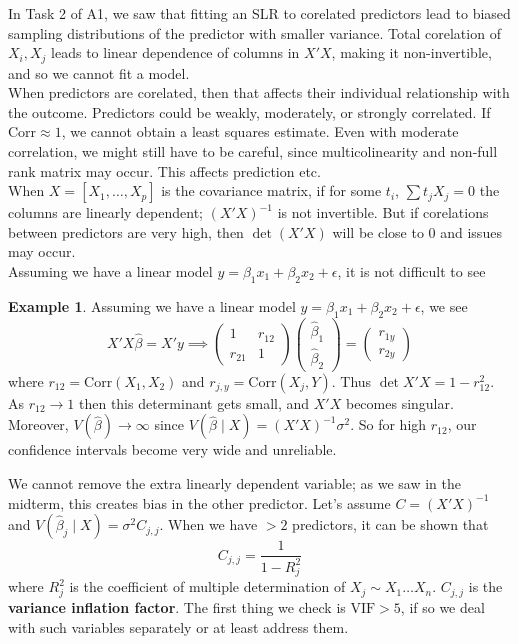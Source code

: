 \documentclass[12pt, a4paper]{article}
\theoremstyle{definition}
\newtheorem{example}{Example}
\newcommand{\imp}{\implies}
\newcommand{\eps}{\epsilon}
\newcommand{\f}{\frac}
\newcommand{\Corr}{\mathrm{Corr}}
\newcommand{\pmat}[1]{\begin{pmatrix}#1\end{pmatrix}}
\begin{document}
	In Task 2 of A1, we saw that fitting an SLR to corelated predictors lead to biased sampling distributions of the predictor with smaller variance. Total corelation of $X_i, X_j$ leads to linear dependence of columns in $X'X$, making it non-invertible, and so we cannot fit a model. \\
	
	When predictors are corelated, then that affects their individual relationship with the outcome. Predictors could be weakly, moderately, or strongly correlated. If $\Corr \approx 1$, we cannot obtain a least squares estimate. Even with moderate correlation, we might still have to be careful, since multicolinearity and non-full rank matrix may occur. This affects prediction etc. \\
	
	When $X = [X_1, \ldots, X_p]$ is the covariance matrix, if for some $t_i$, $\sum t_j X_j = 0$ the columns are linearly dependent; $(X'X)^{-1}$ is not invertible. But if corelations between predictors are very high, then $\det(X'X)$ will be close to $0$ and issues may occur.\\
	
	Assuming we have a linear model $y = \beta_1 x_1 + \beta_2 x_2 + \eps$, it is not difficult to see
	
	\begin{example}
		Assuming we have a linear model $y = \beta_1 x_1 + \beta_2 x_2 + \eps$, we see
		$$X'X \hat \beta = X'y \imp \pmat{1 & r_{12} \\ r_{21} & 1} \pmat{\hat \beta_1 \\ \hat \beta_2} = \pmat{r_{1y} \\ r_{2y}}$$ where $r_{12} = \Corr(X_1, X_2)$ and $r_{j,y} = \Corr(X_j, Y)$. Thus $\det X'X = 1 - r_{12}^2$. As $r_{12} \to 1$ then this determinant gets small, and $X'X$ becomes singular. Moreover, $V(\hat \beta) \to \infty$ since $V(\hat \beta \mid X) = (X'X)^{-1}\sigma^2$. So for high $r_{12}$, our confidence intervals become very wide and unreliable.
	\end{example}

	We cannot remove the extra linearly dependent variable; as we saw in the midterm, this creates bias in the other predictor. Let's assume $C = ({X'X})^{-1}$ and $V(\hat \beta_j \mid X) = \sigma^2 C_{j,j}$. When we have $>2$ predictors, it can be shown that 
	$$C_{j,j} = \f{1}{1-R_j^2}$$ 
	where $R_j^2$ is the coefficient of multiple determination of $X_j \sim X_1 \ldots X_n$.  $C_{j,j}$ is the {\bf variance inflation factor}. The first thing we check is $\text{VIF} > 5$, if so we deal with such variables separately or at least address them.
	
\end{document}
